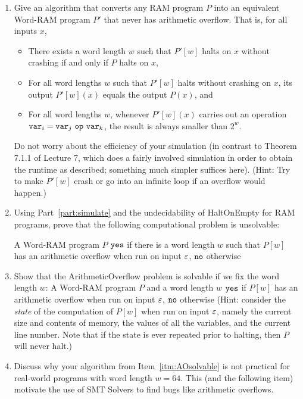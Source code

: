 \documentclass[11pt]{article}
\begin{document}
\begin{enumerate}
  \begin{enumerate}
      \item Give an algorithm that converts any RAM program $P$ into an equivalent Word-RAM program $P'$ that never has arithmetic overflow.  That is, for all inputs $x$, 
      \begin{itemize}
          \item There exists a word length $w$ such that $P'[w]$ halts on $x$ without crashing if and only if $P$ halts on $x$, 
          \item For all word lengths $w$ such that $P'[w]$ halts without crashing on $x$, its output $P'[w](x)$ equals the output $P(x)$, and
          \item For all word lengths $w$, whenever $P'[w](x)$ carries out an operation $\var_i = \var_j\ \op\ \var_k$, the result is always smaller than $2^w$.  
      \end{itemize}
      Do not worry about the efficiency of your simulation (in contrast to Theorem 7.1.1 of Lecture 7, which does a fairly involved simulation in order to obtain the runtime as described; something much simpler suffices here).  (Hint: Try to make $P'[w]$ crash or go into an infinite loop if an overflow would happen.)
      \label{part:simulate}

      \item Using Part~\ref{part:simulate} and the undecidability of HaltOnEmpty for RAM programs, prove that the following computational problem is unsolvable:

    {A Word-RAM program $P$}
    {$\texttt{yes}$ if there is a word length $w$ such that $P[w]$ has an arithmetic overflow when run on input $\varepsilon$, $\texttt{no}$ otherwise}

    \item 
    \label{itm:AOsolvable}
    Show that the ArithmeticOverflow problem is solvable if we fix the word length $w$:
    {A Word-RAM program $P$ and a word length $w$}
    {$\texttt{yes}$ if $P[w]$ has an arithmetic overflow when run on input $\varepsilon$, $\texttt{no}$ otherwise}
    (Hint: consider the {\em state} of the computation of $P[w]$ when run on input $\varepsilon$, namely the current size and contents of memory, the values of all the variables, and the current line number.  Note that if the state is ever repeated prior to halting, then $P$ will never halt.) 

    \item Discuss why your algorithm from Item~\ref{itm:AOsolvable} is not practical for real-world programs with word length $w=64$. This (and the following item) motivate the use of SMT Solvers to find bugs like arithmetic overflows.


\end{enumerate}
\end{enumerate}
\end{document}
